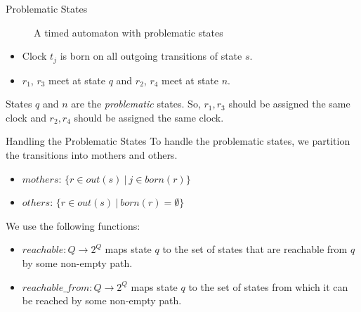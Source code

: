 \documentclass[10pt]{beamer}
\theoremstyle{plain}
\theoremstyle{definition}
\newcommand*{\Var}[1]{\ensuremath{\mathit{#1}}}
\begin{document}
\begin{frame}{Problematic States}
\begin{figure}
\begin{adjustbox}{max totalsize={.99\textwidth}{.5\textheight},center}
		\end{adjustbox}
		\caption{A timed automaton with problematic states}
	\end{figure}
	\begin{itemize}
		\item Clock $t_j$ is born on all outgoing transitions of state $s$.
		\item $r_1$, $r_3$ meet at state $q$ and $r_2$, $r_4$ meet at state $n$.
	\end{itemize}
	States $q$ and $n$ are the \emph{problematic} states. So, $r_1,r_3$ should be assigned the same clock and $r_2,r_4$ should be assigned the same clock.
\end{frame}

\begin{frame}{Handling the Problematic States}
	To handle the problematic states, we partition the transitions into mothers and others.
		\begin{itemize}
			\item $mothers$: $\{r \in \Var{out(s)}~ |~ j \in \Var{born(r)}\}$
			\item $others$: $\{r \in \Var{out(s)}~ |~ \Var{born(r)} = \emptyset\}$
		\end{itemize}
	We use the following functions:
		\begin{itemize}
			\item
			$\Var{reachable}: Q\rightarrow 2^{Q}$ maps state $q$ to the set of states that are reachable from $q$ by some non-empty path.
			\item
			$\Var{reachable\_from}: Q\rightarrow 2^{Q}$ maps state $q$ to the set of states from which it can be reached by some non-empty path.
		\end{itemize}
\end{frame}

%
%	
%
%
\end{document}
